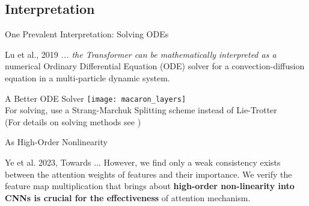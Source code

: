 \subsection{Interpretation}
\begin{frame}[c]{One Prevalent Interpretation: Solving ODEs}
    \large
    \begin{aquote}{Lu et al., 2019 \cite{lu_understanding_2019}}
        {\em ... the Transformer can be mathematically interpreted as
        a} numerical Ordinary Differential Equation (ODE) solver for a
        convection-diffusion equation in a multi-particle dynamic
        system.
    \end{aquote}
\end{frame}


\begin{frame}[c]{A Better ODE Solver}
    \texttt{[image: macaron\_layers]} \\
    \large
    For solving, use a Strang-Marchuk Splitting scheme instead of Lie-Trotter \\
    \normalsize
    (For details on solving methods see \cite{geiser_decomposition_2009})
\end{frame}

\begin{frame}[c]{As High-Order Nonlinearity}
    \large
    \begin{aquote}{Ye et al. 2023, Towards ... \cite{ye_understanding_2023}}
        However, we find only a weak consistency exists between the attention
        weights of features and their importance. We verify the feature map
        multiplication that brings about \textbf{high-order non-linearity into CNNs is
        crucial for the effectiveness} of attention mechanism.
    \end{aquote}
\end{frame}


